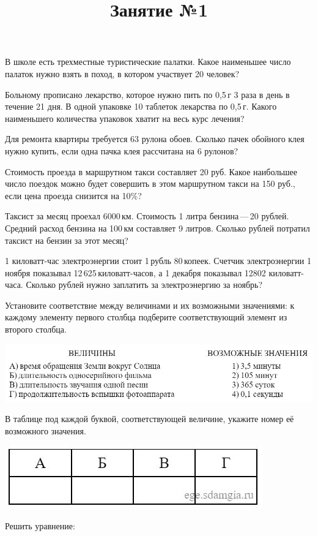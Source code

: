 \title{Занятие №1}
\begin{listofex}
	\item В школе есть трехместные туристические палатки. Какое наименьшее число палаток нужно взять в поход, в котором участвует 20 человек? 
	\item Больному прописано лекарство, которое нужно пить по 0,5 г 3 раза в день в течение 21 дня. В одной упаковке 10 таблеток лекарства по 0,5 г. Какого наименьшего количества упаковок хватит на весь курс лечения?
	\item Для ремонта квартиры требуется 63 рулона обоев. Сколько пачек обойного клея нужно купить, если одна пачка клея рассчитана на 6 рулонов? 
	\item Стоимость проезда в маршрутном такси составляет 20 руб. Какое наибольшее число поездок можно будет совершить в этом маршрутном такси на 150 руб., если цена проезда снизится на 10\%? 
	\item Таксист за месяц проехал 6000 км. Стоимость 1 литра бензина — 20 рублей. Средний расход бензина на 100 км составляет 9 литров. Сколько рублей потратил таксист на бензин за этот месяц? 
	\item 1 киловатт-час электроэнергии стоит 1 рубль 80 копеек. Счетчик электроэнергии 1 ноября показывал 12 625 киловатт-часов, а 1 декабря показывал 12802 киловатт-часа. Сколько рублей нужно заплатить за электроэнергию за ноябрь? 
	\item Установите соответствие между величинами и их возможными значениями: к каждому элементу первого столбца подберите соответствующий элемент из второго столбца.
	\begin{center}
		\includegraphics[width=0.8\linewidth]{125.jpg}
	\end{center}
	В таблице под каждой буквой, соответствующей величине, укажите номер её возможного значения.
	\begin{center}
		\includegraphics[width=0.4\linewidth]{126.jpg}
	\end{center}
	\item Решить уравнение:
	\begin{enumcols}[itemcolumns=1]
		\item {}
		\item {}
		\item {}
		\item {}
		\item {}
	\end{enumcols}
\end{listofex}
